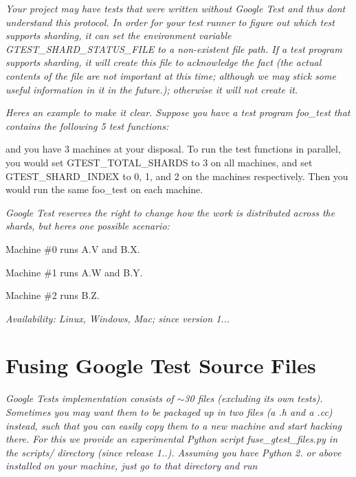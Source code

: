 {\itshape Your project may have tests that were written without Google Test and thus don\textquotesingle{}t understand this protocol. In order for your test runner to figure out which test supports sharding, it can set the environment variable {\ttfamily G\+T\+E\+S\+T\+\_\+\+S\+H\+A\+R\+D\+\_\+\+S\+T\+A\+T\+U\+S\+\_\+\+F\+I\+LE} to a non-\/existent file path. If a test program supports sharding, it will create this file to acknowledge the fact (the actual contents of the file are not important at this time; although we may stick some useful information in it in the future.); otherwise it will not create it.}

{\itshape Here\textquotesingle{}s an example to make it clear. Suppose you have a test program {\ttfamily foo\+\_\+test} that contains the following 5 test functions\+: 
\begin{DoxyCode}{0}
\end{DoxyCode}
 and you have 3 machines at your disposal. To run the test functions in parallel, you would set {\ttfamily G\+T\+E\+S\+T\+\_\+\+T\+O\+T\+A\+L\+\_\+\+S\+H\+A\+R\+DS} to 3 on all machines, and set {\ttfamily G\+T\+E\+S\+T\+\_\+\+S\+H\+A\+R\+D\+\_\+\+I\+N\+D\+EX} to 0, 1, and 2 on the machines respectively. Then you would run the same {\ttfamily foo\+\_\+test} on each machine.}

{\itshape Google Test reserves the right to change how the work is distributed across the shards, but here\textquotesingle{}s one possible scenario\+:}

{\itshape 
\begin{DoxyItemize}
\item Machine \#0 runs {\ttfamily A.\+V} and {\ttfamily B.\+X}.
\item Machine \#1 runs {\ttfamily A.\+W} and {\ttfamily B.\+Y}.
\item Machine \#2 runs {\ttfamily B.\+Z}.
\end{DoxyItemize}}

{\itshape {\itshape Availability\+:} Linux, Windows, Mac; since version 1...}

{\itshape \section*{Fusing Google Test Source Files}}

{\itshape }

{\itshape Google Test\textquotesingle{}s implementation consists of $\sim$30 files (excluding its own tests). Sometimes you may want them to be packaged up in two files (a {\ttfamily .h} and a {\ttfamily .cc}) instead, such that you can easily copy them to a new machine and start hacking there. For this we provide an experimental Python script {\ttfamily fuse\+\_\+gtest\+\_\+files.\+py} in the {\ttfamily scripts/} directory (since release 1..). Assuming you have Python 2. or above installed on your machine, just go to that directory and run 
\begin{DoxyCode}{0}
\end{DoxyCode}
}

